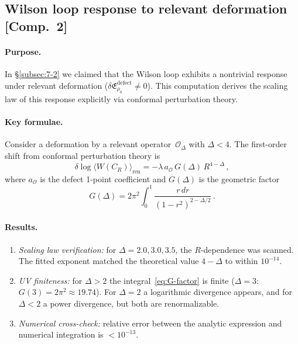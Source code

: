 \documentclass[
  aps,
  prd,
  preprint,
  groupedaddress,
  nofootinbib,
  longbibliography
]{revtex4-2}
\theoremstyle{remark}
\begin{document}
\subsection{Wilson loop response to relevant deformation
  [Comp.~2]}\label{app:A2}

\paragraph{Purpose.}
In \S\ref{subsec:7-2} we claimed that the Wilson loop exhibits
a nontrivial response under relevant deformation
($\delta\mathfrak{E}_{\rho_0}^{\mathrm{defect}}\neq 0$).
This computation derives the scaling law of this response
explicitly via conformal perturbation theory.

\paragraph{Key formulae.}
Consider a deformation by a relevant
operator~$\mathcal{O}_\Delta$ with $\Delta<4$.
The first-order shift from conformal perturbation theory is
\begin{equation}\label{eq:Wilson-CPT-app}
  \delta\log\langle W(C_R)\rangle_{\mathrm{ren}}
  = -\lambda\,a_{\mathcal{O}}\,G(\Delta)\,R^{4-\Delta}\,,
\end{equation}
where $a_{\mathcal{O}}$ is the defect 1-point coefficient and
$G(\Delta)$ is the geometric factor
\begin{equation}\label{eq:G-factor}
  G(\Delta) = 2\pi^2 \int_0^1
    \frac{r\,dr}{(1-r^2)^{2-\Delta/2}}\,.
\end{equation}

\paragraph{Results.}
\begin{enumerate}
\item \emph{Scaling law verification:}
  for $\Delta=2.0,3.0,3.5$, the $R$-dependence was scanned.
  The fitted exponent matched the theoretical value $4-\Delta$
  to within $10^{-14}$.
\item \emph{UV finiteness:}
  for $\Delta>2$ the integral~\eqref{eq:G-factor} is finite
  ($\Delta=3$: $G(3)=2\pi^2\approx 19.74$).
  For $\Delta=2$ a logarithmic divergence appears, and for
  $\Delta<2$ a power divergence, but both are renormalizable.
\item \emph{Numerical cross-check:}
  relative error between the analytic expression and numerical
  integration is ${}<10^{-13}$.
\end{enumerate}
\end{document}
